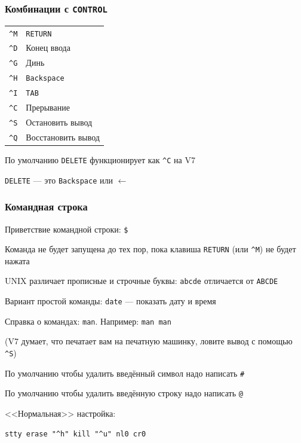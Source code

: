 \documentclass[t,aspectratio=169]{beamer}
\begin{document}
\begin{frame}
    \frametitle{Комбинации с \texttt{CONTROL}}
    \begin{tabular}{cl}
        \texttt{\^}\texttt{M} & \texttt{RETURN} \\
        \texttt{\^}\texttt{D} & Конец ввода \\
        \texttt{\^}\texttt{G} & Динь\\
        \texttt{\^}\texttt{H} & \texttt{Backspace}\\
        \texttt{\^}\texttt{I} & \texttt{TAB}\\
        \texttt{\^}\texttt{C} & Прерывание \\
        \texttt{\^}\texttt{S} & Остановить вывод \\
        \texttt{\^}\texttt{Q} & Восстановить вывод
    \end{tabular}
    \par\vspace{0.25cm}
    По умолчанию \texttt{DELETE} функционирует как \texttt{\^}\texttt{C}
    на V7
    \par\vspace{0.25cm}
    \texttt{DELETE} --- это \texttt{Backspace} или $\leftarrow$
\end{frame}

\begin{frame}[fragile]
    \frametitle{Командная строка}
    Приветствие командной строки: \texttt{\$}
    \par\vspace{0.23cm}
    Команда не будет запущена до тех пор, пока клавиша \texttt{RETURN}
    (или \texttt{\^}\texttt{M}) не будет нажата
    \par\vspace{0.23cm}
    UNIX различает прописные и строчные буквы: \texttt{abcde} отличается
    от \texttt{ABCDE}
    \par\vspace{0.23cm}
    Вариант простой команды: \texttt{date} --- показать дату и время
    \par\vspace{0.23cm}
    Справка о командах: \texttt{man}. Например: \texttt{man man}
    \par\vspace{0.23cm}
    (V7 думает, что печатает вам на печатную машинку, ловите
    вывод с помощью \texttt{\^}\texttt{S})
    \par\vspace{0.23cm}
    По умолчанию чтобы удалить введённый символ надо написать
    \texttt{\#}
    \par\vspace{0.23cm}
    По умолчанию чтобы удалить введённую строку надо написать
    \texttt{@}
    \par\vspace{0.23cm}
    <<Нормальная>> настройка: \begin{verbatim}
stty erase "^h" kill "^u" nl0 cr0\end{verbatim}
\end{frame}
\end{document}
